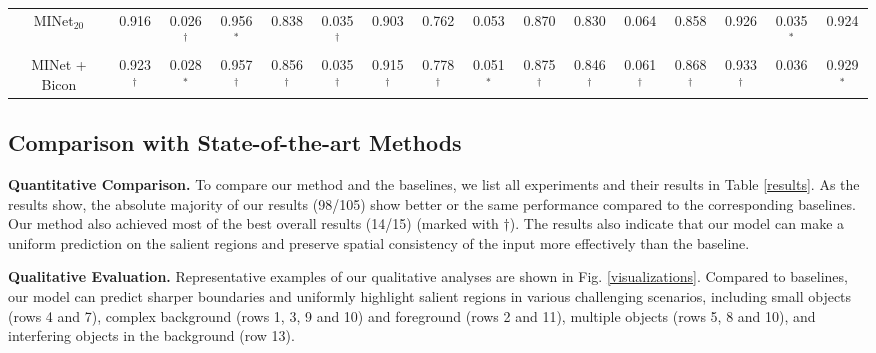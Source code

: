 \documentclass[review]{cvpr}
\begin{document}
\begin{table*}[h!]
{{\begin{tabular}{c ccc ccc ccc ccc ccc}
{MINet$_{20}$ \cite{MINet}}&0.916&\color{BrickRed}0.026\color{blue}$^\dagger$&0.956\color{blue}$^\ast$&0.838&0.035\color{blue}$^\dagger$&0.903&0.762&0.053&0.870&0.830&0.064&0.858&0.926&\color{BrickRed}0.035\color{blue}$^\ast$&0.924\\


{MINet + Bicon}&\color{BrickRed}0.923\color{blue}$^\dagger$&0.028\color{blue}$^\ast$&\color{BrickRed}0.957\color{blue}$^\dagger$&\color{BrickRed}0.856\color{blue}$^\dagger$&0.035\color{blue}$^\dagger$&\color{BrickRed}0.915\color{blue}$^\dagger$&\color{BrickRed}0.778\color{blue}$^\dagger$&\color{BrickRed}0.051\color{blue}$^\ast$&\color{BrickRed}0.875\color{blue}$^\dagger$&\color{BrickRed}0.846\color{blue}$^\dagger$&\color{BrickRed}0.061\color{blue}$^\dagger$&\color{BrickRed}0.868\color{blue}$^\dagger$&\color{BrickRed}0.933\color{blue}$^\dagger$&0.036&\color{BrickRed}0.929\color{blue}$^\ast$\\
\hline
\end{tabular}}}
\vspace{-10pt}
\end{table*}

\subsection{Comparison with State-of-the-art Methods}
\textbf{Quantitative Comparison.} To compare our method and the baselines, we list all experiments and their results in Table \ref{results}. As the results show, the absolute majority of our results (98/105) show better or the same performance compared to the corresponding baselines. Our method also achieved most of the best overall results (14/15) (marked with {\color{blue}$\dagger$}). The results also indicate that our model can make a uniform prediction on the salient regions and preserve spatial consistency of the input more effectively than the baseline.

\textbf{Qualitative Evaluation.} Representative examples of our qualitative analyses are shown in Fig. \ref{visualizations}. Compared to baselines, our model can predict sharper boundaries and uniformly highlight salient regions in various challenging scenarios, including small objects (rows 4 and 7), complex background (rows 1, 3, 9 and 10) and foreground (rows 2 and 11), multiple objects (rows 5, 8 and 10), and interfering objects in the background (row 13).

\begin{figure*}[h!]
\begin{center}
\texttt{[image: \{vis\_result.jpg]}}
\end{center}
\vspace{-8pt}
   \caption{Visual comparisons of different models.}
\label{visualizations}
\vspace{-10pt}
\end{figure*}
\end{document}

